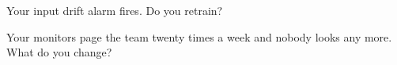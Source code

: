 \begin{interviewq}\label{iq:ml:monitoring-and-retraining:5}
Your input drift alarm fires. Do you retrain?
\end{interviewq}

\begin{interviewq}\label{iq:ml:monitoring-and-retraining:6}
Your monitors page the team twenty times a week and nobody looks any more. What do you change?
\end{interviewq}
